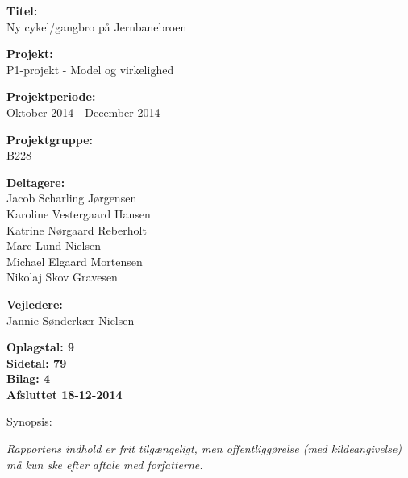 \begin{minipage}[t]{0.48\textwidth}
\textbf{Titel:} \\[5pt]\bigskip\hspace{2ex}
Ny cykel/gangbro på Jernbanebroen

\textbf{Projekt:} \\[5pt]\bigskip\hspace{2ex}
P1-projekt - Model og virkelighed

\textbf{Projektperiode:} \\[5pt]\bigskip\hspace{2ex}
Oktober 2014 - December 2014

\textbf{Projektgruppe:} \\[5pt]\bigskip\hspace{2ex}
B228

\textbf{Deltagere:} \\[5pt]\hspace*{2ex}
Jacob Scharling Jørgensen \\\hspace*{2ex}
Karoline Vestergaard Hansen \\\hspace*{2ex}
Katrine Nørgaard Reberholt \\\hspace*{2ex}
Marc Lund Nielsen \\\hspace*{2ex}
Michael Elgaard Mortensen \\\hspace*{2ex}
Nikolaj Skov Gravesen \\\bigskip\hspace{2ex}

\textbf{Vejledere:} \\[5pt]\hspace*{2ex}
Jannie Sønderkær Nielsen \\\bigskip\hspace{2ex}

\vspace*{1cm}

\textbf{Oplagstal: 9} \\
\textbf{Sidetal: 79} \\
\textbf{Bilag: 4} \\ 
\textbf{Afsluttet 18-12-2014}

\end{minipage}
\hfill
\begin{minipage}[t]{0.483\textwidth}
Synopsis: \\[5pt]
\fbox{\parbox{7cm}{\bigskip\bigskip}}
\end{minipage}

\vfill

{\footnotesize\itshape Rapportens indhold er frit tilgængeligt, men offentliggørelse (med kildeangivelse) må kun ske efter aftale med forfatterne.}

